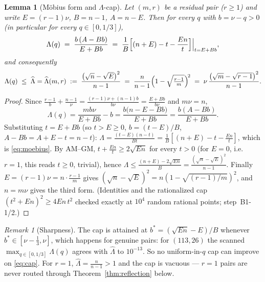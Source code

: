 \documentclass[11pt]{article}
\newtheorem{lemma}[theorem]{Lemma}
\theoremstyle{remark}
\newtheorem{remark}[theorem]{Remark}
\theoremstyle{plain}
\theoremstyle{plain}
\newcommand{\Lhat}{\widehat\Lambda}
\begin{document}
\begin{lemma}[M\"obius form and $\Lambda$-cap]\label{lem:cap}
Let $(m,r)$ be a residual pair ($r\ge1$) and write $E=(r-1)\nu$, $B=n-1$, $A=n-E$.  Then for every $q$ with $b=\nu-q>0$ (in particular for every $q\in[0,1/3]$),
\begin{equation}\label{eq:moebius}
        \Lambda(q)\;=\;\frac{b\,(A-Bb)}{E+Bb}
        \;=\;\frac1B\Bigl[(n+E)-t-\frac{En}{t}\Bigr]
        \Big|_{t=E+Bb},
\end{equation}
and consequently
\begin{equation}\label{eq:cap}
        \Lambda(q)\;\le\;\Lhat=\Lhat(m,r)
        \;:=\;\frac{\bigl(\sqrt n-\sqrt E\bigr)^2}{n-1}
        \;=\;\frac{n}{n-1}\Bigl(1-\sqrt{\tfrac{r-1}{m}}\Bigr)^{\!2}
        \;=\;\nu\,\frac{\bigl(\sqrt m-\sqrt{r-1}\bigr)^2}{n-1}.
\end{equation}
\end{lemma}

\begin{proof}
Since $\frac{r-1}b+\frac{n-1}\nu=\frac{(r-1)\nu+(n-1)b}{b\nu}=\frac{E+Bb}{b\nu}$ and $m\nu=n$,
\[
        \Lambda(q)=\frac{mb\nu}{E+Bb}-b
        =\frac{b\bigl(n-E-Bb\bigr)}{E+Bb}
        =\frac{b(A-Bb)}{E+Bb}.
\]
Substituting $t=E+Bb$ (so $t>E\ge0$, $b=(t-E)/B$, $A-Bb=A+E-t=n-t$):
$\Lambda=\frac{(t-E)(n-t)}{Bt}=\frac1B[(n+E)-t-\frac{En}{t}]$, which is \eqref{eq:moebius}.  By AM--GM, $t+\frac{En}t\ge2\sqrt{En}$ for every $t>0$ (for $E=0$, i.e.\ $r=1$, this reads $t\ge0$, trivial), hence
$\Lambda\le\frac{(n+E)-2\sqrt{En}}{B}=\frac{(\sqrt n-\sqrt E)^2}{n-1}$.
Finally $E=(r-1)\nu=n\cdot\frac{r-1}m$ gives $(\sqrt n-\sqrt E)^2=n(1-\sqrt{(r-1)/m})^2$, and $n=m\nu$ gives the third form.  (Identities and the rationalized cap $(t^2+En)^2\ge4En\,t^2$ checked exactly at $10^4$ random rational points; step~B1-1/2.)
\end{proof}

\begin{remark}[Sharpness]\label{rmk:sharp}
The cap is attained at $b^*=(\sqrt{En}-E)/B$ whenever $b^*\in[\nu-\tfrac13,\nu]$, which happens for genuine pairs: for $(113,26)$ the scanned $\max_{q\in[0,1/3]}\Lambda(q)$ agrees with $\Lhat$ to $10^{-13}$.  So no uniform-in-$q$ cap can improve on \eqref{eq:cap}.  For $r=1$, $\Lhat=\frac n{n-1}>1$ and the cap is vacuous --- $r=1$ pairs are never routed through Theorem~\ref{thm:reflection} below.
\end{remark}
\end{document}
